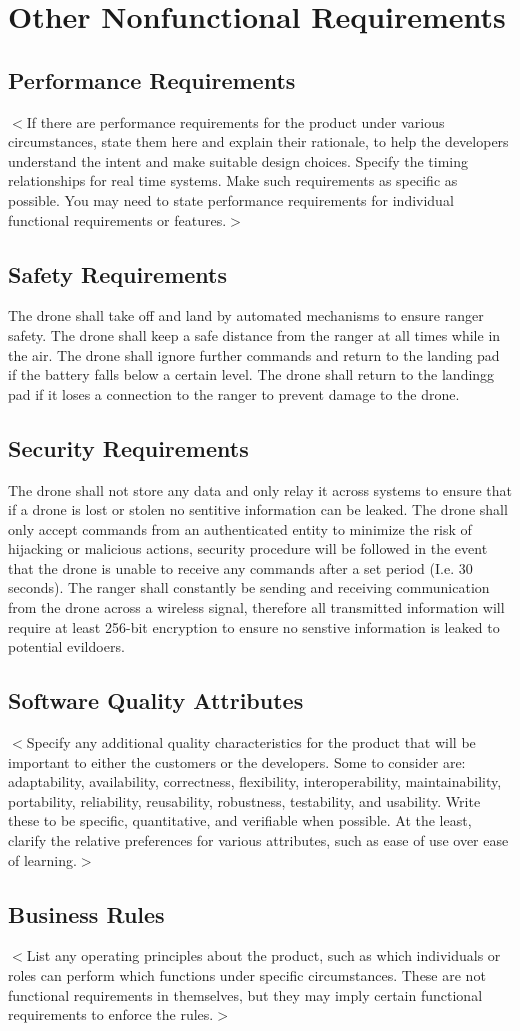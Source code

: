 \chapter{Other Nonfunctional Requirements}

\section{Performance Requirements}
$<$If there are performance requirements for the product under various
circumstances, state them here and explain their rationale, to help the
developers understand the intent and make suitable design choices. Specify the
timing relationships for real time systems. Make such requirements as specific
as possible. You may need to state performance requirements for individual
functional requirements or features.$>$

\section{Safety Requirements}
The drone shall take off and land by automated mechanisms to ensure ranger safety.
The drone shall keep a safe distance from the ranger at all times while in the air.
The drone shall ignore further commands and return to the landing pad if the battery falls below a certain level.
The drone shall return to the landingg pad if it loses a connection to the ranger to prevent damage to the drone.

\section{Security Requirements}
The drone shall not store any data and only relay it across systems to ensure that if a drone is lost or stolen no sentitive information can be leaked.
The drone shall only accept commands from an authenticated entity to minimize the risk of hijacking or malicious actions, 
security procedure will be followed in the event that the drone is unable to receive any commands after a set period (I.e. 30 seconds).
The ranger shall constantly be sending and receiving communication from the drone across a wireless signal, 
therefore all transmitted information will require at least 256-bit encryption to ensure no senstive information is leaked to potential evildoers.

\section{Software Quality Attributes}
$<$Specify any additional quality characteristics for the product that will be
important to either the customers or the developers. Some to consider are:
adaptability, availability, correctness, flexibility, interoperability,
maintainability, portability, reliability, reusability, robustness, testability,
and usability. Write these to be specific, quantitative, and verifiable when
possible. At the least, clarify the relative preferences for various attributes,
such as ease of use over ease of learning.$>$

\section{Business Rules}
$<$List any operating principles about the product, such as which individuals or
roles can perform which functions under specific circumstances. These are not
functional requirements in themselves, but they may imply certain functional
requirements to enforce the rules.$>$
